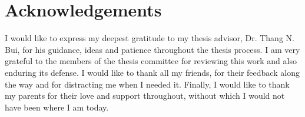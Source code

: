 \chapter*{Acknowledgements}
I would like to express my deepest gratitude to my thesis advisor, Dr. Thang N. Bui, for his guidance, ideas and patience throughout the thesis  process.  I am very grateful to the members of the thesis committee for reviewing this work and also enduring its defense. I would like to thank all my friends, for their feedback along the way and for distracting me when I needed it. Finally, I would like to thank my parents for their love and support throughout, without which I would not have been where I am today. 